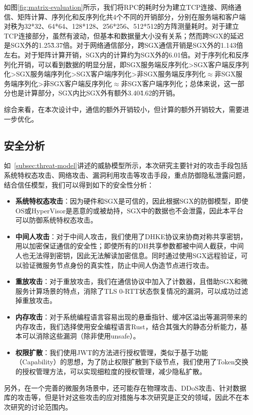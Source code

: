 如图\ref{fig:matrix-evaluation}所示，我们将RPC的耗时分为建立TCP连接、网络通信、矩阵计算、序列化和反序列化共4个不同的开销部分，分别在服务端和客户端对秩为32*32、64*64、128*128、256*256、512*512的方阵测量耗时。对于建立TCP连接部分，虽然有波动，但基本和数据量大小没有关系；然而跨SGX的延迟是SGX外的1.25\~3.37倍。对于网络通信部分，跨SGX通信开销是SGX外的1.143倍左右。对于矩阵计算开销，SGX内的计算约为SGX外的6.01倍。对于序列化和反序列化开销，可以看到数据的明显分层，即SGX服务端反序列化>SGX客户端反序列化>SGX服务端序列化>SGX客户端序列化>非SGX服务端反序列化$\approx$非SGX服务端序列化>非SGX客户端反序列化$\approx$非SGX客户端序列化；总体来说，这一部分也是计算部分，SGX内比SGX外有额外3.40\~4.62的开销。

综合来看，在本次设计中，通信的额外开销较小，但计算的额外开销较大，需要进一步优化。

\subsection{安全分析}

如~\cref{subsec:threat-model}讲述的威胁模型所示，本次研究主要针对的攻击手段包括系统特权态攻击、网络攻击、漏洞利用攻击等攻击手段，重点防御隐私泄露问题，结合信任模型，我们可以得到如下的安全性分析：

\begin{itemize}
    \item \textbf{系统特权态攻击}：因为硬件和SGX是可信的，因此根据SGX的防御模型，即使OS或HyperVisor是恶意的或被劫持，SGX中的数据也不会泄露，因此本平台可以防御系统特权态攻击。
    \item \textbf{中间人攻击}：对于中间人攻击，我们使用了DHKE协议来协商对称共享密钥，用以加密保证通信的安全性；即使所有的DH共享参数都被中间人截获，中间人也无法得到密钥，因此无法解读加密信息。同时通过使用SGX远程验证，可以验证微服务节点身份的真实性，防止中间人伪造节点进行攻击。
    \item \textbf{重放攻击}：对于重放攻击，我们在通信协议中加入了计数器，且借助SGX和微服务计算场景的特点，消除了TLS 0-RTT状态恢复情况的漏洞，可以成功过滤掉重放攻击。
    \item \textbf{内存攻击}：对于系统编程语言容易出现的悬垂指针、缓冲区溢出等漏洞带来的内存攻击，我们选择使用安全编程语言Rust，结合其强大的静态分析能力，基本可以消除这些漏洞（除非使用unsafe）。
    \item \textbf{权限扩散}：我们使用JWT的方法进行授权管理，类似于基于功能（Capability）的思想，为了防止权限扩散到下级节点，我们使用了Token交换的授权管理方法，可以实现细粒度的授权管理，减少隐私扩散。
\end{itemize}

另外，在一个完善的微服务场景中，还可能存在物理攻击、DDoS攻击、针对数据库的攻击等，但是针对这些攻击的应对措施与本次研究是正交的领域，因此不在本次研究的讨论范围内。
